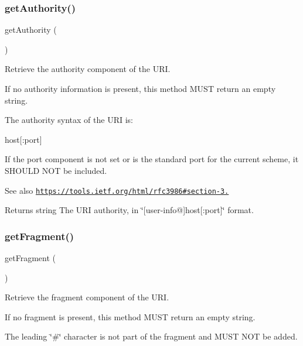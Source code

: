 \subsubsection{\texorpdfstring{get\+Authority()}{getAuthority()}}
{\footnotesize\ttfamily get\+Authority (\begin{DoxyParamCaption}{ }\end{DoxyParamCaption})}

Retrieve the authority component of the U\+RI.

If no authority information is present, this method M\+U\+ST return an empty string.

The authority syntax of the U\+RI is\+:


\begin{DoxyPre}
host[:port]
\end{DoxyPre}


If the port component is not set or is the standard port for the current scheme, it S\+H\+O\+U\+LD N\+OT be included.

\begin{DoxySeeAlso}{See also}
\href{https://tools.ietf.org/html/rfc3986#section-3.2}{\tt https\+://tools.\+ietf.\+org/html/rfc3986\#section-\/3.} 
\end{DoxySeeAlso}
\begin{DoxyReturn}{Returns}
string The U\+RI authority, in \char`\"{}\mbox{[}user-\/info@\mbox{]}host\mbox{[}\+:port\mbox{]}\char`\"{} format. 
\end{DoxyReturn}
\mbox{\label{class_pes_1_1_http_1_1_uri_a8e9be93affbfde43840cbaf4b6712ea9}} 
\subsubsection{\texorpdfstring{get\+Fragment()}{getFragment()}}
{\footnotesize\ttfamily get\+Fragment (\begin{DoxyParamCaption}{ }\end{DoxyParamCaption})}

Retrieve the fragment component of the U\+RI.

If no fragment is present, this method M\+U\+ST return an empty string.

The leading \char`\"{}\#\char`\"{} character is not part of the fragment and M\+U\+ST N\+OT be added.

